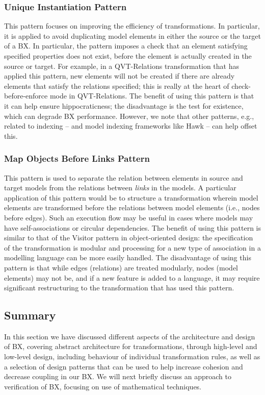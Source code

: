 \subsubsection{Unique Instantiation Pattern}
This pattern focuses on improving the efficiency of transformations. In particular, it is applied to avoid duplicating model elements in either the source or the target of a BX. In particular, the pattern imposes a check that an element satisfying specified properties does not exist, before the element is actually created in the source or target. For example, in a QVT-Relations transformation that has applied this pattern, new elements will not be created if there are already elements that satisfy the relations specified; this is really at the heart of check-before-enforce mode in QVT-Relations. The benefit of using this pattern is that it can help ensure hippocraticness; the disadvantage is the test for existence, which can degrade BX performance. However, we note that other patterns, e.g., related to indexing \cite{LanoKR14} -- and model indexing frameworks like Hawk -- can help offset this.

\subsubsection{Map Objects Before Links Pattern}
This pattern is used to separate the relation between elements in source and target models from the relations between \textit{links} in the models. A particular application of this pattern would be to structure a transformation wherein model elements are transformed before the relations between model elements (i.e., nodes before edges). Such an execution flow may be useful in cases where models may have self-associations or circular dependencies. The benefit of using this pattern is similar to that of the Visitor pattern \cite{Gof1995} in object-oriented design: the specification of the transformation is modular and processing for a new type of association in a modelling language can be more easily handled. The disadvantage of using this pattern is that while edges (relations) are treated modularly, nodes (model elements) may not be, and if a new feature is added to a language, it may require significant restructuring to the transformation that has used this pattern.

\subsection{Summary}
In this section we have discussed different aspects of the architecture and design of BX, covering abstract architecture for transformations, through high-level and low-level design, including behaviour of individual transformation rules, as well as a selection of design patterns that can be used to help increase cohesion and decrease coupling in our BX. We will next briefly discuss an approach to verification of BX, focusing on use of mathematical techniques.